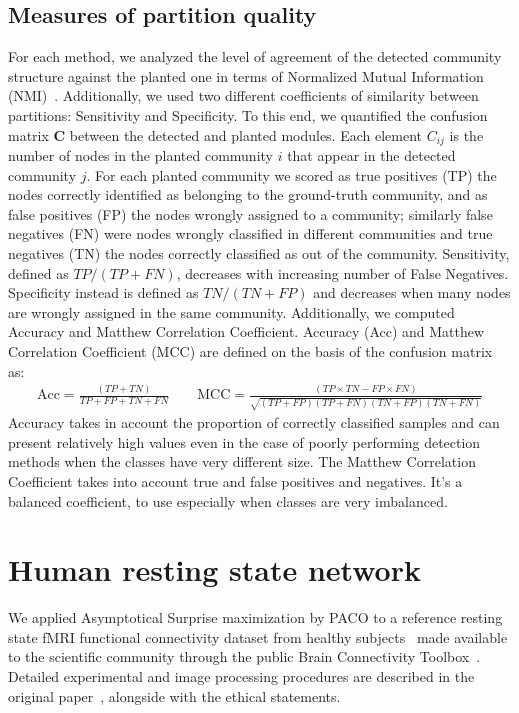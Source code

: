 \subsection{Measures of partition quality}
For each method, we analyzed the level of agreement of the detected community structure against the planted one in terms of Normalized Mutual Information (NMI)~\cite{danon2005}.
Additionally, we used two different coefficients of similarity between partitions: Sensitivity and Specificity. 
To this end, we quantified the confusion matrix $\mathbf{C}$ between the detected and planted modules. Each element $C_{ij}$ is the number of nodes in the planted community $i$ that appear in the detected community $j$.
For each planted community we scored as true positives (TP) the nodes correctly identified as belonging to the ground-truth community, and as false positives (FP) the nodes wrongly assigned to a community; similarly false negatives (FN) were nodes wrongly classified in different communities and true negatives (TN) the nodes correctly classified as out of the community.
Sensitivity, defined as $TP/(TP+FN)$, decreases with increasing number of False Negatives. Specificity instead is defined as $TN/(TN+FP)$ and decreases when many nodes are wrongly assigned in the same community.
Additionally, we computed Accuracy and Matthew Correlation Coefficient. Accuracy (Acc) and Matthew Correlation Coefficient (MCC) are defined on the basis of the confusion matrix as:
\begin{align*}
\textrm{Acc}=\frac{(TP+TN)}{TP+FP+TN+FN} \qquad \textrm{MCC}=\frac{(TP\times TN-FP\times FN)}{\sqrt{(TP+FP)(TP+FN)(TN+FP)(TN+FN)}}
\end{align*}
Accuracy takes in account the proportion of correctly classified samples and can present relatively high values even in the case of poorly performing detection methods when the classes have very different size.
The Matthew Correlation Coefficient  takes into account true and false positives and negatives. It's a balanced coefficient, to use especially when classes are very imbalanced.

\section{Human resting state network}
We applied Asymptotical Surprise maximization by PACO to a reference resting state fMRI functional connectivity dataset from healthy subjects~\cite{crossley2013a} made available to the scientific community through the public Brain Connectivity Toolbox~\cite{rubinov2010}. 
Detailed experimental and image processing procedures are described in the original paper~\cite{crossley2013a}, alongside with the ethical statements.

